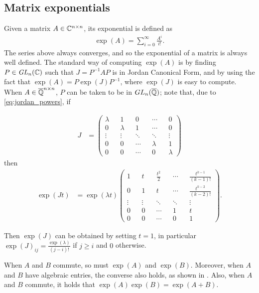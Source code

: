 \subsection{Matrix exponentials}
\label{sec:matrix_exp}

Given a matrix $A \in \mathbb{C}^{n \times n}$, its exponential is defined as
\begin{align*}
\exp(A) = \sum \limits_{i=0}^{\infty} \frac{A^{i}}{i!} .
\end{align*}
The series above always converges, and so the exponential of a matrix is always well defined. The standard way of computing $\exp(A)$ is by finding $P \in \mathit{GL}_{n}(\mathbb{C})$ such that $J=P^{-1}AP$ is in Jordan Canonical Form, and by using the fact that $\exp(A) = P \exp(J) P^{-1}$, where $\exp(J)$ is easy to compute. When $A \in \overline{\mathbb{Q}}^{n \times n}$, $P$ can be taken to be in $GL_{n}(\overline{\mathbb{Q}})$; note that, due to \cref{eq:jordan_powers}, if

\begin{align*}
J &= \begin{pmatrix}
\lambda && 1 && 0 && \cdots && 0 \\
0 && \lambda && 1 &&\cdots && 0 \\
\vdots && \vdots && \ddots && \ddots && \vdots \\
0 && 0 && \cdots && \lambda && 1 \\
0 && 0 && \cdots && 0 && \lambda
\end{pmatrix}
\end{align*}
then
\begin{align*}
\exp(Jt) &= \exp(\lambda t) \begin{pmatrix}
1 && t && \frac{t^{2}}{2} && \cdots && \frac{t^{k-1}}{(k-1)!} \\
0 && 1 && t && \cdots && \frac{t^{k-2}}{(k-2)!} \\
\vdots && \vdots &&\ddots && \ddots && \vdots \\
0 && 0 && \cdots && 1 && t \\
0 && 0 && \cdots && 0 && 1
\end{pmatrix} .
\end{align*}

Then $\exp(J)$ can be obtained by setting $t=1$, in particular $\exp(J)_{ij} = \frac{\exp(\lambda)}{(j-i)!}$ if $j \geq i$ and $0$ otherwise.

When $A$ and $B$ commute, so must $\exp(A)$ and $\exp(B)$. Moreover, when $A$ and $B$ have algebraic entries, the converse also holds, as shown in \cite{MatrixExps}. Also, when $A$ and $B$ commute, it holds that $\exp(A)\exp(B) = \exp(A+B)$.

